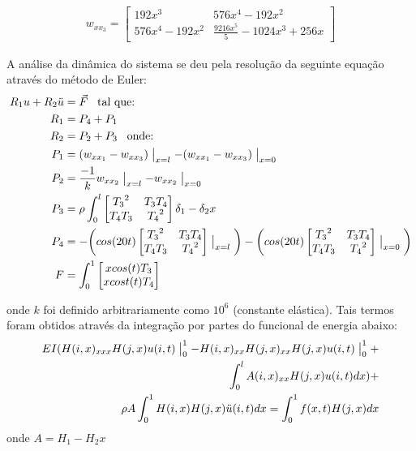 \documentclass[fleqn, 11pt]{article}
\begin{document}
\begin{align*}
w_{xx_{3}} = \begin{bmatrix}
192x^3 & 576x^4 - 192x^2 \\
576x^4 - 192x^2 & \frac{9216x^5}{5} - 1024x^3 + 256x
\end{bmatrix}
\end{align*}


A análise da dinâmica do sistema se deu pela resolução da seguinte equação através do método de Euler:
\begin{align*}
R_1 u + R_2 \ddot{u} & = \vec{F} \text{\phantom{0} tal que:} \\
R_1 & = P_4 + P_1 \\
R_2 & = P_2 + P_3 \text{\phantom{0} onde:} \\
P_1 & = (w_{xx_{1}} - w_{xx_{3}})\bigm|_{x=l} - (w_{xx_{1}} - w_{xx_{3}})\bigm|_{x=0} \\
P_2 & =  \frac{-1}{k} w_{xx_{2}}\bigm|_{x=l} - w_{xx_{2}}\bigm|_{x=0}\\
P_3 & = \rho \int_{0}^{l} \begin{bmatrix}
{T_3}^2 & T_3 T_4 \\
T_4 T_3 & {T_4}^2
\end{bmatrix}
 \delta_1 - \delta_2 x\\
P_4 & = - \bigg ( cos(20t) 
\begin{bmatrix}
{T_3}^2 & T_3 T_4 \\
T_4 T_3 & {T_4}^2
\end{bmatrix} \bigm|_{x=l} \bigg ) - \bigg( cos(20t)
\begin{bmatrix}
{T_3}^2 & T_3 T_4 \\
T_4 T_3 & {T_4}^2
\end{bmatrix} \bigm|_{x=0}
\bigg ) \\
F & = \int_{0}^{1} 
\begin{bmatrix}
x cos(t) T_3 \\
x cost(t) T_4
\end{bmatrix}
\end{align*}

onde $k$ foi definido arbitrariamente como $10^6$ (constante elástica). Tais termos foram obtidos através da integração por partes do funcional de energia abaixo:
\begin{align*}
EI (H(i,x)_{xxx} H(j,x) u(i,t) \bigm|_{0}^{1} - H(i,x)_{xx} H(j,x)_{xx} H(j,x) u(i,t) \bigm|_{0}^{1} + \\
\int_{0}^{l} A(i,x)_{xx} H(j,x) u(i,t) dx) + \\
\rho A \int_{0}^{1} H(i,x) H(j,x) \ddot{u} (i,t) dx = \int_{0}^{1} f(x,t) H(j,x) dx 
\end{align*}
onde $A = H_1 - H_2x$
\end{document}

